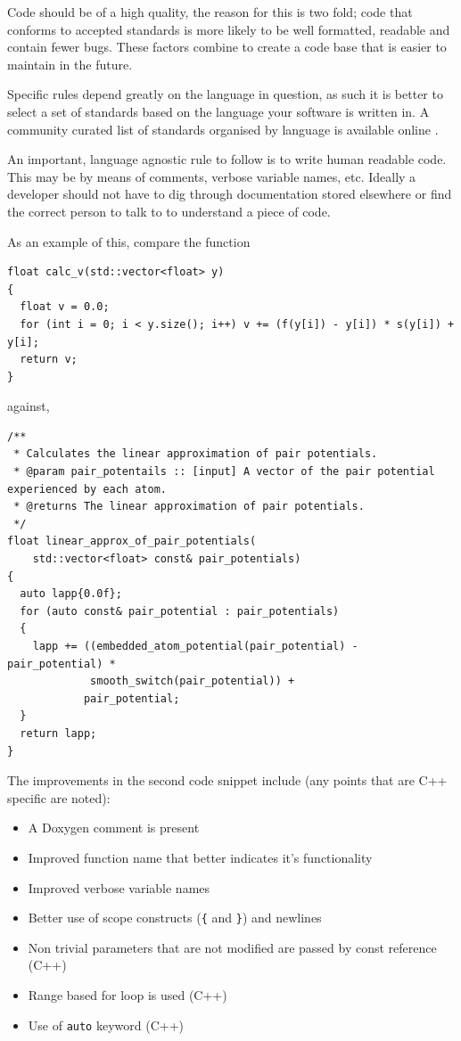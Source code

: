 \documentclass[jnr]{iosart2x}
\begin{document}
Code should be of a high quality, the reason for this is two fold; code that conforms to accepted standards is more likely to be well formatted, readable and contain fewer bugs.
These factors combine to create a code base that is easier to maintain in the future.

Specific rules depend greatly on the language in question, as such it is better to select a set of standards based on the language your software is written in.
A community curated list of standards organised by language is available online \cite{Awesome_Guidelines}.

An important, language agnostic rule to follow is to write human readable code.
This may be by means of comments, verbose variable names, etc.
Ideally a developer should not have to dig through documentation stored elsewhere or find the correct person to talk to to understand a piece of code.

As an example of this, compare the function \cite{Lim_2015}

\begin{lstlisting}
float calc_v(std::vector<float> y)
{
  float v = 0.0;
  for (int i = 0; i < y.size(); i++) v += (f(y[i]) - y[i]) * s(y[i]) + y[i];
  return v;
}
\end{lstlisting}

against,

\begin{lstlisting}
/**
 * Calculates the linear approximation of pair potentials.
 * @param pair_potentails :: [input] A vector of the pair potential experienced by each atom.
 * @returns The linear approximation of pair potentials.
 */
float linear_approx_of_pair_potentials(
    std::vector<float> const& pair_potentials)
{
  auto lapp{0.0f};
  for (auto const& pair_potential : pair_potentials)
  {
    lapp += ((embedded_atom_potential(pair_potential) - pair_potential) *
             smooth_switch(pair_potential)) +
            pair_potential;
  }
  return lapp;
}
\end{lstlisting}

The improvements in the second code snippet include (any points that are C++ specific are noted):
\begin{itemize}
  \item{A Doxygen comment is present}
  \item{Improved function name that better indicates it's functionality}
  \item{Improved verbose variable names}
  \item{Better use of scope constructs (\texttt{\{} and \texttt{\}}) and newlines}
  \item{Non trivial parameters that are not modified are passed by const reference (C++)}
  \item{Range based for loop is used (C++)}
  \item{Use of \texttt{auto} keyword (C++)}
\end{itemize}
\end{document}
